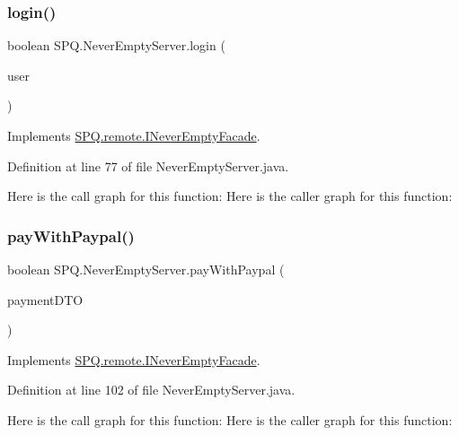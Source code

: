 \subsubsection{\texorpdfstring{login()}{login()}}
{\footnotesize\ttfamily boolean S\+P\+Q.\+Never\+Empty\+Server.\+login (\begin{DoxyParamCaption}\item[{\mbox{\hyperlink{class_s_p_q_1_1dto_1_1_user_d_t_o}{User\+D\+TO}}}]{user }\end{DoxyParamCaption})}



Implements \mbox{\hyperlink{interface_s_p_q_1_1remote_1_1_i_never_empty_facade_a2440fa36695c63e4e4c30fc25965f853}{S\+P\+Q.\+remote.\+I\+Never\+Empty\+Facade}}.



Definition at line 77 of file Never\+Empty\+Server.\+java.

Here is the call graph for this function\+:
Here is the caller graph for this function\+:
\mbox{\label{class_s_p_q_1_1_never_empty_server_a954ea8c563055eae79564b357e557f85}} 
\subsubsection{\texorpdfstring{pay\+With\+Paypal()}{payWithPaypal()}}
{\footnotesize\ttfamily boolean S\+P\+Q.\+Never\+Empty\+Server.\+pay\+With\+Paypal (\begin{DoxyParamCaption}\item[{\mbox{\hyperlink{class_s_p_q_1_1dto_1_1_payment_d_t_o}{Payment\+D\+TO}}}]{payment\+D\+TO }\end{DoxyParamCaption})}



Implements \mbox{\hyperlink{interface_s_p_q_1_1remote_1_1_i_never_empty_facade_a2d34c64f91537d8c7138094e418de785}{S\+P\+Q.\+remote.\+I\+Never\+Empty\+Facade}}.



Definition at line 102 of file Never\+Empty\+Server.\+java.

Here is the call graph for this function\+:
Here is the caller graph for this function\+:
\mbox{\label{class_s_p_q_1_1_never_empty_server_a455fa773e66917007842f9a92243ffa8}} 
